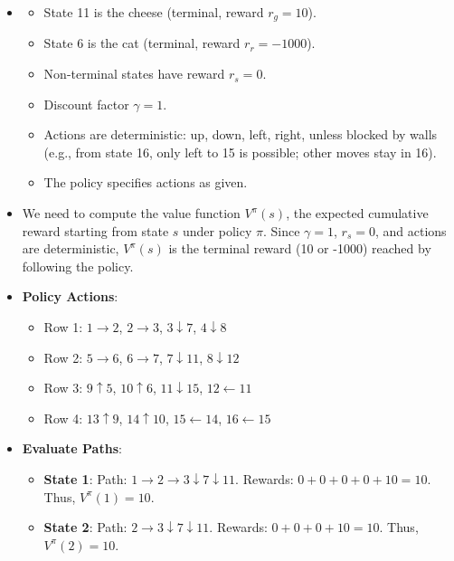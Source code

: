 \documentclass[a3paper,12pt]{extarticle} %
\begin{document}
\begin{enumerate}
\begin{itemize}
    \item 
    \begin{itemize}
        \item State 11 is the cheese (terminal, reward \( r_g = 10 \)).
        \item State 6 is the cat (terminal, reward \( r_r = -1000 \)).
        \item Non-terminal states have reward \( r_s = 0 \).
        \item Discount factor \( \gamma = 1 \).
        \item Actions are deterministic: up, down, left, right, unless blocked by walls (e.g., from state 16, only left to 15 is possible; other moves stay in 16).
        \item The policy specifies actions as given.
    \end{itemize}
    \item  We need to compute the value function \( V^\pi(s) \), the expected cumulative reward starting from state \( s \) under policy \( \pi \). Since \( \gamma = 1 \), \( r_s = 0 \), and actions are deterministic, \( V^\pi(s) \) is the terminal reward (10 or -1000) reached by following the policy.
    \item \textbf{Policy Actions}:
    \begin{itemize}
        \item Row 1: \( 1 \rightarrow 2 \), \( 2 \rightarrow 3 \), \( 3 \downarrow 7 \), \( 4 \downarrow 8 \)
        \item Row 2: \( 5 \rightarrow 6 \), \( 6 \rightarrow 7 \), \( 7 \downarrow 11 \), \( 8 \downarrow 12 \)
        \item Row 3: \( 9 \uparrow 5 \), \( 10 \uparrow 6 \), \( 11 \downarrow 15 \), \( 12 \leftarrow 11 \)
        \item Row 4: \( 13 \uparrow 9 \), \( 14 \uparrow 10 \), \( 15 \leftarrow 14 \), \( 16 \leftarrow 15 \)
    \end{itemize}
    \item \textbf{Evaluate Paths}:
    \begin{itemize}
        \item \textbf{State 1}: Path: \( 1 \rightarrow 2 \rightarrow 3 \downarrow 7 \downarrow 11 \). Rewards: \( 0 + 0 + 0 + 0 + 10 = 10 \). Thus, \( V^\pi(1) = 10 \).
        \item \textbf{State 2}: Path: \( 2 \rightarrow 3 \downarrow 7 \downarrow 11 \). Rewards: \( 0 + 0 + 0 + 10 = 10 \). Thus, \( V^\pi(2) = 10 \).

\end{itemize}
\end{itemize}
\end{enumerate}
\end{document}
